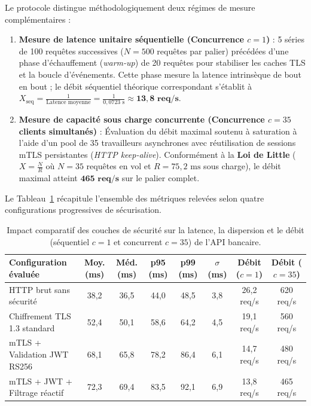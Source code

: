 Le protocole distingue méthodologiquement deux régimes de mesure complémentaires :
\begin{enumerate}[leftmargin=*]
    \item \textbf{Mesure de latence unitaire séquentielle (Concurrence $c = 1$)} : 5 séries de 100 requêtes successives ($N = 500$ requêtes par palier) précédées d'une phase d'échauffement (\textit{warm-up}) de 20 requêtes pour stabiliser les caches TLS et la boucle d'événements. Cette phase mesure la latence intrinsèque de bout en bout ; le débit séquentiel théorique correspondant s'établit à $X_{\text{seq}} = \frac{1}{\text{Latence moyenne}} = \frac{1}{0{,}0723\text{ s}} \approx \mathbf{13{,}8\text{ req/s}}$.
    \item \textbf{Mesure de capacité sous charge concurrente (Concurrence $c = 35$ clients simultanés)} : Évaluation du débit maximal soutenu à saturation à l'aide d'un pool de 35 travailleurs asynchrones avec réutilisation de sessions mTLS persistantes (\textit{HTTP keep-alive}). Conformément à la \textbf{Loi de Little} ($X = \frac{N}{R}$ où $N = 35$ requêtes en vol et $R = 75{,}2\text{ ms}$ sous charge), le débit maximal atteint $\mathbf{465\text{ req/s}}$ sur le palier complet.
\end{enumerate}

Le Tableau~\ref{tab:performance} récapitule l'ensemble des métriques relevées selon quatre configurations progressives de sécurisation.

\begin{table}[!htbp]
\centering
\footnotesize
\begin{tabular}{@{}lccccccc@{}}
\toprule
\textbf{Configuration évaluée} & \textbf{Moy. (ms)} & \textbf{Méd. (ms)} & \textbf{p95 (ms)} & \textbf{p99 (ms)} & \textbf{$\sigma$ (ms)} & \textbf{Débit ($c{=}1$)} & \textbf{Débit ($c{=}35$)} \\
\midrule
HTTP brut sans sécurité & 38{,}2 & 36{,}5 & 44{,}0 & 48{,}5 & 3{,}8 & 26{,}2 req/s & 620 req/s \\
Chiffrement TLS 1.3 standard & 52{,}4 & 50{,}1 & 58{,}6 & 64{,}2 & 4{,}5 & 19{,}1 req/s & 560 req/s \\
mTLS + Validation JWT RS256 & 68{,}1 & 65{,}8 & 78{,}2 & 86{,}4 & 6{,}1 & 14{,}7 req/s & 480 req/s \\
mTLS + JWT + Filtrage réactif & 72{,}3 & 69{,}4 & 83{,}5 & 92{,}1 & 6{,}9 & 13{,}8 req/s & 465 req/s \\
\bottomrule
\end{tabular}
\caption{Impact comparatif des couches de sécurité sur la latence, la dispersion et le débit (séquentiel $c{=}1$ et concurrent $c{=}35$) de l'API bancaire.}
\label{tab:performance}
\end{table}

